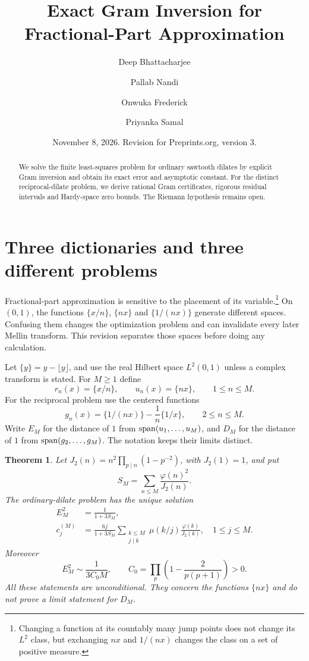 \documentclass[11pt]{amsart}
\title[Exact Gram inversion]{Exact Gram Inversion for Fractional-Part Approximation}
\author{Deep Bhattacharjee}
\author{Pallab Nandi}
\author{Onwuka Frederick}
\author{Priyanka Samal}
\date{November 8, 2026. Revision for Preprints.org, version 3.}
\newtheorem{theorem}{Theorem}[section]
\theoremstyle{definition}
\begin{document}
\begin{abstract}
We solve the finite least-squares problem for ordinary sawtooth dilates by explicit Gram inversion and obtain its exact error and asymptotic constant. For the distinct reciprocal-dilate problem, we derive rational Gram certificates, rigorous residual intervals and Hardy-space zero bounds. The Riemann hypothesis remains open.
\end{abstract}
\maketitle
\section{Three dictionaries and three different problems}
Fractional-part approximation is sensitive to the placement of its
variable.\footnote{Changing a function at its countably many jump
points does not change its $L^2$ class, but exchanging $nx$ and $1/(nx)$
changes the class on a set of positive measure.} On $(0,1)$, the functions $\{x/n\}$, $\{nx\}$ and
$\{1/(nx)\}$ generate different spaces. Confusing them changes the
optimization problem and can invalidate every later Mellin transform.
This revision separates those spaces before doing any calculation.

Let $\{y\}=y-\lfloor y\rfloor$, and use the real Hilbert space
$L^2(0,1)$ unless a complex transform is stated. For $M\ge1$ define
\[
 r_n(x)=\{x/n\},\qquad u_n(x)=\{nx\},\qquad 1\le n\le M.
\]
For the reciprocal problem use the centered functions
\begin{equation}\label{eq:gn}
 g_n(x)=\{1/(nx)\}-\frac1n\{1/x\},\qquad 2\le n\le M.
\end{equation}
Write $E_M$ for the distance of $1$ from $\operatorname{span}(u_1,\ldots,u_M)$,
and $D_M$ for the distance of $1$ from $\operatorname{span}(g_2,\ldots,g_M)$.
The notation keeps their limits distinct.

\begin{theorem}\label{thm:intro}
Let $J_2(n)=n^2\prod_{p\mid n}(1-p^{-2})$, with $J_2(1)=1$, and put
\[
 S_M=\sum_{n\le M}\frac{\varphi(n)^2}{J_2(n)}.
\]
The ordinary-dilate problem has the unique solution
\begin{align}
 E_M^2&=\frac1{1+3S_M},\label{eq:exacterror}\\
 c_j^{(M)}&=\frac{6j}{1+3S_M}
       \sum_{\substack{k\le M\\j\mid k}}
       \mu(k/j)\frac{\varphi(k)}{J_2(k)},\quad 1\le j\le M.\label{eq:exactcoef}
\end{align}
Moreover
\begin{equation}\label{eq:asymptintro}
 E_M^2\sim\frac1{3C_0M},\qquad
 C_0=\prod_p\left(1-\frac2{p(p+1)}\right)>0.
\end{equation}
All these statements are unconditional. They concern the functions
$\{nx\}$ and do not prove a limit statement for $D_M$.
\end{theorem}
\end{document}
